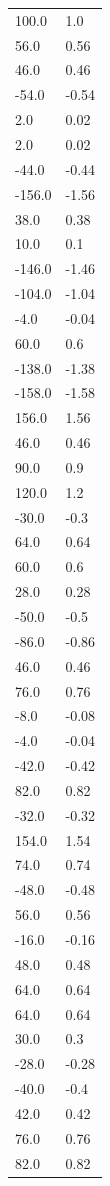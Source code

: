 \begin{longtable}{ll}
100.0 & 1.0 \\
56.0 & 0.56 \\
46.0 & 0.46 \\
-54.0 & -0.54 \\
2.0 & 0.02 \\
2.0 & 0.02 \\
-44.0 & -0.44 \\
-156.0 & -1.56 \\
38.0 & 0.38 \\
10.0 & 0.1 \\
-146.0 & -1.46 \\
-104.0 & -1.04 \\
-4.0 & -0.04 \\
60.0 & 0.6 \\
-138.0 & -1.38 \\
-158.0 & -1.58 \\
156.0 & 1.56 \\
46.0 & 0.46 \\
90.0 & 0.9 \\
120.0 & 1.2 \\
-30.0 & -0.3 \\
64.0 & 0.64 \\
60.0 & 0.6 \\
28.0 & 0.28 \\
-50.0 & -0.5 \\
-86.0 & -0.86 \\
46.0 & 0.46 \\
76.0 & 0.76 \\
-8.0 & -0.08 \\
-4.0 & -0.04 \\
-42.0 & -0.42 \\
82.0 & 0.82 \\
-32.0 & -0.32 \\
154.0 & 1.54 \\
74.0 & 0.74 \\
-48.0 & -0.48 \\
56.0 & 0.56 \\
-16.0 & -0.16 \\
48.0 & 0.48 \\
64.0 & 0.64 \\
64.0 & 0.64 \\
30.0 & 0.3 \\
-28.0 & -0.28 \\
-40.0 & -0.4 \\
42.0 & 0.42 \\
76.0 & 0.76 \\
82.0 & 0.82 \\

\end{longtable}
